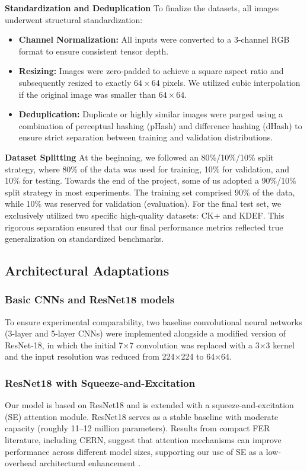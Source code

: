 \textbf{Standardization and Deduplication}
To finalize the datasets, all images underwent structural standardization:
\begin{itemize}
    \item \textbf{Channel Normalization:} All inputs were converted to a 3-channel RGB format to ensure consistent tensor depth.
    \item \textbf{Resizing:} Images were zero-padded to achieve a square aspect ratio and subsequently resized to exactly $64 \times 64$ pixels. We utilized cubic interpolation if the original image was smaller than $64 \times 64$.
    \item \textbf{Deduplication:} Duplicate or highly similar images were purged using a combination of perceptual hashing (pHash) and difference hashing (dHash) to ensure strict separation between training and validation distributions.
\end{itemize}

\textbf{Dataset Splitting}
At the beginning, we followed an 80\%/10\%/10\% split strategy, where 80\% of the data was used for training, 10\% for validation, and 10\% for testing.
Towards the end of the project, some of us adopted a 90\%/10\% split strategy in most experiments. The training set comprised 90\% of the data, while 10\% was reserved for validation (evaluation). For the final test set, we exclusively utilized two specific high-quality datasets: CK+ and KDEF. This rigorous separation ensured that our final performance metrics reflected true generalization on standardized benchmarks.

\subsection{Architectural Adaptations}

\subsubsection{Basic CNNs and ResNet18 models}
To ensure experimental comparability, two baseline convolutional neural networks (3-layer and 5-layer CNNs) were implemented alongside a modified version of ResNet-18, in which the initial 7×7 convolution was replaced with a 3×3 kernel and the input resolution was reduced from 224×224 to 64×64. 

\subsubsection{ResNet18 with Squeeze-and-Excitation}
Our model is based on ResNet18 and is extended with a squeeze-and-excitation (SE) attention module. ResNet18 serves as a stable baseline with moderate capacity (roughly 11--12 million parameters). Results from compact FER literature, including CERN, suggest that attention mechanisms can improve performance across different model sizes, supporting our use of SE as a low-overhead architectural enhancement \cite{GERA20229}.

